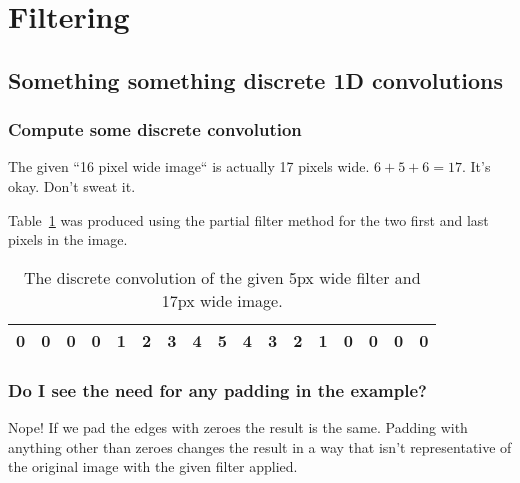 \section{Filtering}
\subsection{Something something discrete 1D convolutions}

\subsubsection{Compute some discrete convolution}
The given ``16 pixel wide image`` is actually 17 pixels wide.
$6+5+6 = 17$.
It's okay.
Don't sweat it.

Table~\ref{tab:11a} was produced using the partial filter method for the two first and last pixels in the image.

\begin{table}[H]
\centering
\begin{tabular}{|c|c|c|c|c|c|c|c|c|c|c|c|c|c|c|c|c|}
    \hline
    0 & 0 & 0 & 0 & 1 & 2 & 3 & 4 & 5 & 4 & 3 & 2 & 1 & 0 & 0 & 0 & 0 \\
    \hline
\end{tabular}
\caption{The discrete convolution of the given 5px wide filter and 17px wide image.}
\label{tab:11a}
\end{table}


\subsubsection{Do I see the need for any padding in the example?}
Nope!
If we pad the edges with zeroes the result is the same.
Padding with anything other than zeroes changes the result in a way that isn't representative of the original image with the given filter applied.
